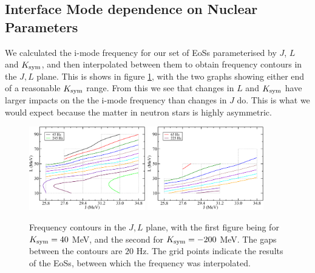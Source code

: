 \documentclass[fleqn,usenatbib]{mnras}
\begin{document}
\subsection{Interface Mode dependence on Nuclear Parameters}
\hspace{\parindent}We calculated the i-mode frequency for our set of EoSs parameterised by $J$, $L$ and $K_{\rm sym}$, and then interpolated between them to obtain frequency contours in the $J,L$ plane. This is shows in figure \ref{fig:freq_contours}, with the two graphs showing either end of a reasonable $K_{\rm sym}$ range. From this we see that changes in $L$ and $K_{\rm sym}$ have larger impacts on the the i-mode frequency than changes in $J$ do. This is what we would expect because the matter in neutron stars is highly asymmetric.



\begin{figure}
\centering
\includegraphics[width=0.45\textwidth,angle=0]{contours_20gap_K40}
\includegraphics[width=0.45\textwidth,angle=0]{contours_20gap_Km200}
\caption{Frequency contours in the $J,L$ plane, with the first figure being for $K_{\rm sym}=40$ MeV, and the second for $K_{\rm sym}=-200$ MeV. The gaps between the contours are $20$ Hz. The grid points indicate the results of the EoSs, between which the frequency was interpolated.}
\label{fig:freq_contours}
\end{figure}
\end{document}

